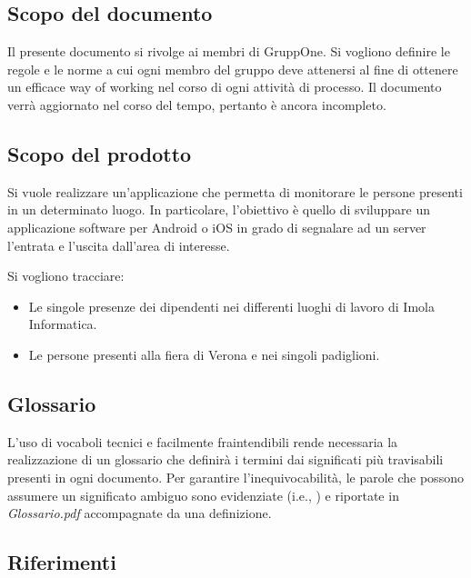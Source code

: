 \documentclass[../norme-di-progetto.tex]{subfiles}
\begin{document}
\subsection{Scopo del documento}%
\label{sub:scopo_del_documento}

Il presente documento si rivolge ai membri di GruppOne.
Si vogliono definire le regole e le norme a cui ogni membro del gruppo deve attenersi al fine di ottenere un efficace way of working nel corso di ogni attività di processo.
Il documento verrà aggiornato nel corso del tempo, pertanto è ancora incompleto.

\subsection{Scopo del prodotto}%
\label{sub:scopo_del_prodotto}

Si vuole realizzare un'applicazione che permetta di monitorare le persone presenti in un determinato luogo.
In particolare, l'obiettivo è quello di sviluppare un applicazione software per Android o iOS in grado di segnalare ad un server l'entrata e l'uscita dall'area di interesse.

Si vogliono tracciare:

\begin{itemize}
  \item Le singole presenze dei dipendenti nei differenti luoghi di lavoro di Imola Informatica.
  \item Le persone presenti alla fiera di Verona e nei singoli padiglioni.
\end{itemize}

\subsection{Glossario}%
\label{sub:glossario}

L'uso di vocaboli tecnici e facilmente fraintendibili rende necessaria la realizzazione di un glossario che definirà i termini dai significati più travisabili presenti in ogni documento.
Per garantire l'inequivocabilità, le parole che possono assumere un significato ambiguo sono evidenziate (i.e., ) e riportate in \textit{Glossario.pdf} accompagnate da una definizione.

\subsection{Riferimenti}%
\label{sub:riferimenti}
\end{document}
